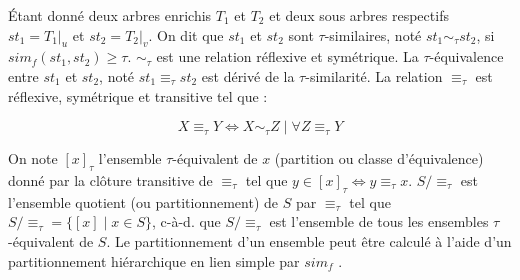 \begin{definition}
    Étant donné deux arbres enrichis $T_1$ et $T_2$ et deux sous arbres respectifs $st_1 = T_1|_u$ et $st_2 = T_2|_v$.
    On dit que $st_1$ et $st_2$ sont $\tau$-similaires, noté $st_1 \sim_\tau st_2$, si $sim_f(st_1, st_2) \geq \tau$. $\sim_\tau$ est une relation réflexive et symétrique.
    La $\tau$-équivalence entre $st_1$ et $st_2$, noté $st_1 \equiv_\tau st_2$ est dérivé de la $\tau$-similarité. La relation $\equiv_\tau$ est réflexive, symétrique et transitive tel que :

    \[
        X \equiv_\tau Y \iff X \sim_\tau Z \mid \forall Z \equiv_\tau Y
    \]

    On note $[x]_\tau$ l'ensemble $\tau$-équivalent de $x$ (partition ou classe d'équivalence) donné par la clôture transitive de $\equiv_\tau$ tel que $y \in [x]_\tau \iff y \equiv_\tau x$.
    $S/\equiv_\tau$ est l'ensemble quotient (ou partitionnement) de $S$ par $\equiv_\tau$ tel que $S/\equiv_\tau = \{[x] \mid x \in S\}$, c-à-d. que $S/\equiv_\tau$ est l'ensemble de tous les ensembles $\tau$-équivalent de $S$.
    Le partitionnement d'un ensemble peut être calculé à l'aide d'un partitionnement hiérarchique en lien simple par $sim_f$ \cite{carlssonCharacterizationStabilityConvergence2010}.
\end{definition}

